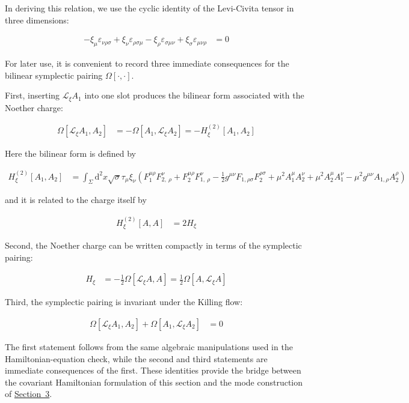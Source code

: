 In deriving this relation, we use the cyclic identity of the Levi-Civita tensor in three dimensions:

\begin{align}
-\xi _{\mu}\varepsilon _{\nu \rho \sigma}+\xi _{\nu}\varepsilon _{\rho \sigma \mu}-\xi _{\rho}\varepsilon _{\sigma \mu \nu}+\xi _{\sigma}\varepsilon _{\mu \nu \rho} & =0
\end{align}

For later use, it is convenient to record three immediate consequences for the bilinear symplectic pairing $\Omega[\cdot,\cdot]$.

First, inserting $\mathcal{L}_{\xi}A_{1}$ into one slot produces the bilinear form associated with the Noether charge:

\begin{align}
\Omega[\mathcal{L}_{\xi}A_{1},A_{2}] & =-\Omega[A_{1},\mathcal{L}_{\xi}A_{2}]=-H_{\xi}^{(2)}[A_{1},A_{2}]
\end{align}

Here the bilinear form is defined by

\begin{align}
H_{\xi}^{(2)}[A_{1},A_{2}] & =\int _{\Sigma}\mathrm{d}^{2}x\sqrt{ \sigma }\tau _{\mu}\xi _{\nu}\left(F_{1}^{\mu \rho}F_{2,~\rho}^{\nu}+F_{2}^{\mu \rho}F_{1,~\rho}^{\nu}-\frac{1}{2}g^{\mu \nu}F_{1,\rho \sigma}F_{2}^{\rho \sigma}+\mu ^{2}A_{1}^{\mu}A_{2}^{\nu}+\mu ^{2}A_{2}^{\mu}A_{1}^{\nu}-\mu ^{2}g^{\mu \nu}A_{1,\rho}A_{2}^{\rho}\right)
\end{align}

and it is related to the charge itself by

\begin{align}
H_{\xi}^{(2)}[A,A] & =2H_{\xi}
\end{align}

Second, the Noether charge can be written compactly in terms of the symplectic pairing:

\begin{align}
H_{\xi} & =-\frac{1}{2}\Omega[\mathcal{L}_{\xi}A,A]=\frac{1}{2}\Omega[A,\mathcal{L}_{\xi}A]
\end{align}

Third, the symplectic pairing is invariant under the Killing flow:

\begin{align}
\Omega[\mathcal{L}_{\xi}A_{1},A_{2}]+\Omega[A_{1},\mathcal{L}_{\xi}A_{2}] & =0
\end{align}

The first statement follows from the same algebraic manipulations used in the Hamiltonian-equation check, while the second and third statements are immediate consequences of the first. These identities provide the bridge between the covariant Hamiltonian formulation of this section and the mode construction of \hyperref[sec:quantization]{Section~3}.
